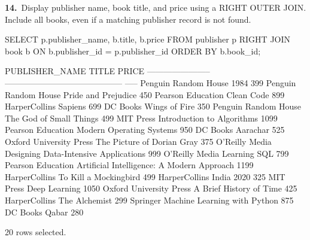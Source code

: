 \noindent\begin{minipage}{\linewidth}
\begingroup{}
{\fontsize{14}{17}\selectfont\textbf{14.}}\ Display publisher name, book title, and price using a RIGHT OUTER JOIN. Include all books, even if a matching publisher record is not found.\par
\endgroup\vspace{12pt}


\begin{sqlcode}
SELECT p.publisher_name, b.title, b.price
FROM publisher p
RIGHT JOIN book b ON b.publisher_id = p.publisher_id
ORDER BY b.book_id;
\end{sqlcode}

\vspace{18pt}


\begin{sqlout}[fontsize=\small]
PUBLISHER_NAME           TITLE                                       PRICE
-----------------------  ------------------------------------------  -----
Penguin Random House     1984                                          399
Penguin Random House     Pride and Prejudice                           450
Pearson Education        Clean Code                                    899
HarperCollins            Sapiens                                       699
DC Books                 Wings of Fire                                 350
Penguin Random House     The God of Small Things                       499
MIT Press                Introduction to Algorithms                   1099
Pearson Education        Modern Operating Systems                      950
DC Books                 Aarachar                                      525
Oxford University Press  The Picture of Dorian Gray                    375
O'Reilly Media           Designing Data-Intensive Applications         999
O'Reilly Media           Learning SQL                                  799
Pearson Education        Artificial Intelligence: A Modern Approach   1199
HarperCollins            To Kill a Mockingbird                         499
HarperCollins            India 2020                                    325
MIT Press                Deep Learning                                1050
Oxford University Press  A Brief History of Time                       425
HarperCollins            The Alchemist                                 299
Springer                 Machine Learning with Python                  875
DC Books                 Qabar                                         280

20 rows selected.
\end{sqlout}
\end{minipage}\par\vspace{24pt}

